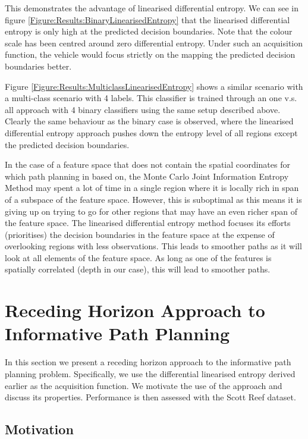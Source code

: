 \documentclass{article}
\begin{document}
		This demonstrates the advantage of linearised differential entropy. We can see in figure \ref{Figure:Results:BinaryLinearisedEntropy} that the linearised differential entropy is only high at the predicted decision boundaries. Note that the colour scale has been centred around zero differential entropy. Under such an acquisition function, the vehicle would focus strictly on the mapping the predicted decision boundaries better.
		
		Figure \ref{Figure:Results:MulticlassLinearisedEntropy} shows a similar scenario with a multi-class scenario with 4 labels. This classifier is trained through an one v.s. all approach with 4 binary classifiers using the same setup described above. Clearly the same behaviour as the binary case is observed, where the linearised differential entropy approach pushes down the entropy level of all regions except the predicted decision boundaries.
		
		In the case of a feature space that does not contain the spatial coordinates for which path planning in based on, the Monte Carlo Joint Information Entropy Method may spent a lot of time in a single region where it is locally rich in span of a subspace of the feature space. However, this is suboptimal as this means it is giving up on trying to go for other regions that may have an even richer span of the feature space. The linearised differential entropy method focuses its efforts (prioritises) the decision boundaries in the feature space at the expense of overlooking regions with less observations. This leads to smoother paths as it will look at all elements of the feature space. As long as one of the features is spatially correlated (depth in our case), this will lead to smoother paths.
		
\section{Receding Horizon Approach to Informative Path Planning}
\label{Section:RecedingHorizonFormulation}

	In this section we present a receding horizon approach to the informative path planning problem. Specifically, we use the differential linearised entropy derived earlier as the acquisition function. We motivate the use of the approach and discuss its properties. Performance is then assessed with the Scott Reef dataset.
	
	\subsection{Motivation}
	
\end{document}
